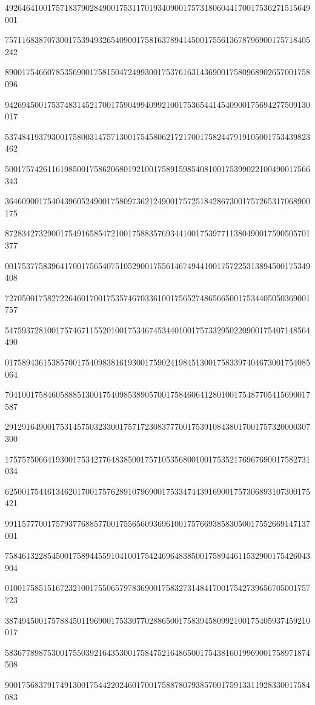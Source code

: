 \documentclass[10pt]{article}
\begin{document}
492646410017571837902849001753117019340900175731806044170017536271515649001\par
757116838707300175394932654090017581637894145001755613678796900175718405242\par
890017546607853569001758150472499300175376163143690017580968902657001758096\par
942694500175374831452170017590499409921001753654414540900175694277509130017\par
537484193793001758003147571300175458062172170017582447919105001753439823462\par
500175742611619850017586206801921001758915985408100175399022100490017566343\par
364609001754043960524900175809736212490017572518428673001757265317068900175\par
872834273290017549165854721001758835769344100175397711380490017590505701377\par
001753775839641700175654075105290017556146749441001757225313894500175349408\par
727050017582722646017001753574670336100175652748656650017534405050369001757\par
547593728100175746711552010017534674534401001757332950220900175407148564490\par
017589436153857001754098381619300175902419845130017583397404673001754085064\par
704100175846058885130017540985389057001758460641280100175487705415690017587\par
291291649001753145750323300175717230837770017539108438017001757320000307300\par
175757506641930017534277648385001757105356800100175352176967690017582731034\par
625001754461346201700175762891079690017533474439169001757306893107300175421\par
991157770017579377688577001755656093696100175766938583050017552669147137001\par
758461322854500175894455910410017542469648385001758944611532900175426043904\par
010017585151672321001755065797836900175832731484170017542739656705001757723\par
387494500175788450119690017533077028865001758394580992100175405937459210017\par
583677898753001755039216435300175847521648650017543816019969001758971874508\par
900175683791749130017544220246017001758878079385700175913311928330017584083\par
\end{document}
